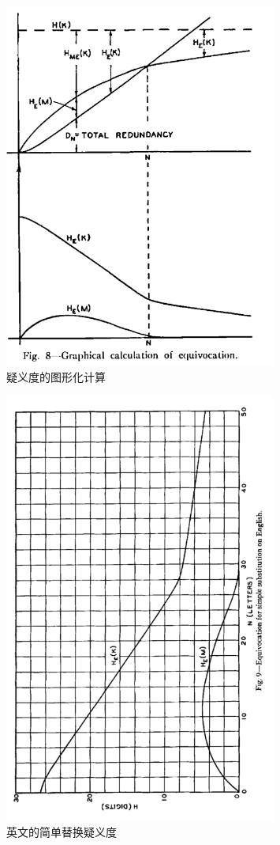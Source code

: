 \documentclass[]{article}
\begin{document}
\begin{figure}[htbp]
	\centering
	\includegraphics[width=0.8\textwidth]{fig8.png}
	\caption{疑义度的图形化计算}
	\label{fig:fig8}
\end{figure}

\begin{figure}[htbp]
	\centering
	\includegraphics[width=0.8\textwidth]{fig9.png}
	\caption{英文的简单替换疑义度}
	\label{fig:fig9}
\end{figure}
\end{document}
